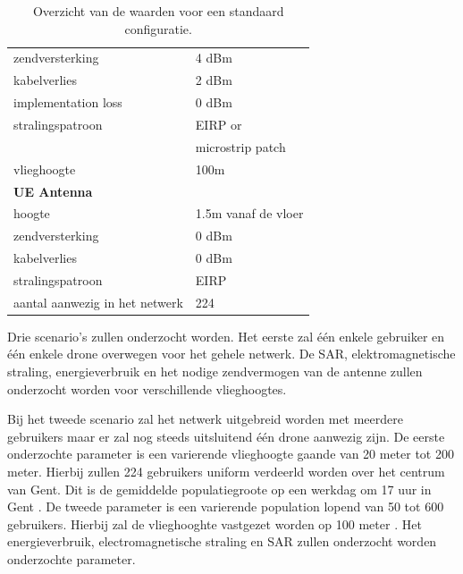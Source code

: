 \documentclass[twocolumn]{phdsymp_dutch}
\begin{document}
\begin{table}[!htb]
\begin{tabular}[t]{ll}
        \hspace{3mm}  zendversterking           & 4 dBm   \\ 
        \hspace{3mm}  kabelverlies               & 2 dBm   \\ 
        \hspace{3mm}  implementation loss       & 0 dBm   \\
        \hspace{3mm}  stralingspatroon         & EIRP or\\
         \hspace{3mm}                           & microstrip patch\\
        \hspace{3mm}  vlieghoogte                & 100m  \\
        \hline
        \multicolumn{2}{l}{\textbf{UE Antenna}} \\
        \hline 
        \hspace{3mm} hoogte                     & 1.5m vanaf de vloer      \\ 
        \hspace{3mm} zendversterking                      & 0 dBm   \\ 
        \hspace{3mm} kabelverlies              & 0 dBm   \\ 
        \hspace{3mm} stralingspatroon         & EIRP  \\
        \hspace{3mm} aantal aanwezig in het netwerk         & 224  \\
        \toprule
\end{tabular}
\caption{Overzicht van de waarden voor een standaard configuratie.}
\label{table:defaultconf}
\end{table}

Drie scenario's zullen onderzocht worden. Het eerste zal \'e\'en enkele gebruiker en 
 \'e\'en enkele drone overwegen 
voor het gehele netwerk. De \gls{SAR}, elektromagnetische straling, energieverbruik  en 
het nodige zendvermogen van de antenne zullen onderzocht worden voor verschillende vlieghoogtes.

Bij het tweede scenario zal het netwerk uitgebreid worden met meerdere gebruikers maar 
er zal nog steeds uitsluitend  \'e\'en drone aanwezig zijn. De eerste onderzochte parameter 
is een varierende vlieghoogte gaande van 20 meter tot 200 meter. Hierbij zullen 224 gebruikers 
uniform verdeerld worden over het centrum van Gent. Dit is de gemiddelde populatiegroote op 
een werkdag om 17 uur in Gent \cite{J2}.
De tweede parameter is een varierende population lopend van 50 tot 600 gebruikers. Hierbij 
zal de vlieghooghte vastgezet worden op 100 meter \cite{J2}.
Het energieverbruik, electromagnetische straling en \gls{SAR} zullen onderzocht worden 
onderzochte parameter.
\end{document}
